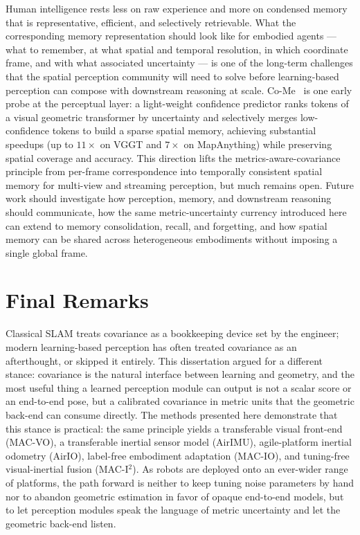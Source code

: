 Human intelligence rests less on raw experience and more on condensed memory that is representative, efficient, and selectively retrievable.
What the corresponding memory representation should look like for embodied agents --- what to remember, at what spatial and temporal resolution, in which coordinate frame, and with what associated uncertainty --- is one of the long-term challenges that the spatial perception community will need to solve before learning-based perception can compose with downstream reasoning at scale.
Co-Me~\cite{chen2025come} is one early probe at the perceptual layer: a light-weight confidence predictor ranks tokens of a visual geometric transformer by uncertainty and selectively merges low-confidence tokens to build a sparse spatial memory, achieving substantial speedups (up to $11\times$ on VGGT and $7\times$ on MapAnything) while preserving spatial coverage and accuracy.
This direction lifts the metrics-aware-covariance principle from per-frame correspondence into temporally consistent spatial memory for multi-view and streaming perception, but much remains open.
Future work should investigate how perception, memory, and downstream reasoning should communicate, how the same metric-uncertainty currency introduced here can extend to memory consolidation, recall, and forgetting, and how spatial memory can be shared across heterogeneous embodiments without imposing a single global frame.

\section{Final Remarks}

Classical SLAM treats covariance as a bookkeeping device set by the engineer; modern learning-based perception has often treated covariance as an afterthought, or skipped it entirely.
This dissertation argued for a different stance: covariance is the natural interface between learning and geometry, and the most useful thing a learned perception module can output is not a scalar score or an end-to-end pose, but a calibrated covariance in metric units that the geometric back-end can consume directly.
The methods presented here demonstrate that this stance is practical: the same principle yields a transferable visual front-end (MAC-VO), a transferable inertial sensor model (AirIMU), agile-platform inertial odometry (AirIO), label-free embodiment adaptation (MAC-IO), and tuning-free visual-inertial fusion (MAC-I$^2$).
As robots are deployed onto an ever-wider range of platforms, the path forward is neither to keep tuning noise parameters by hand nor to abandon geometric estimation in favor of opaque end-to-end models, but to let perception modules speak the language of metric uncertainty and let the geometric back-end listen.
